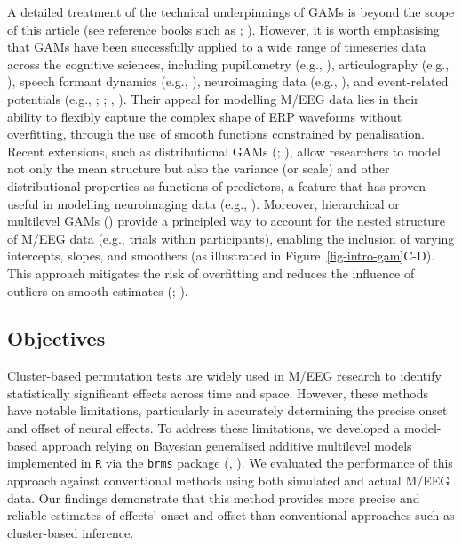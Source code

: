 \documentclass[
  doc,
  floatsintext,
  longtable,
  a4paper,
  nolmodern,
  notxfonts,
  notimes,
  colorlinks=true,linkcolor=blue,citecolor=blue,urlcolor=blue]{apa7}
\begin{document}
A detailed treatment of the technical underpinnings of GAMs is beyond
the scope of this article (see reference books such as
;
). However, it is worth emphasising
that GAMs have been successfully applied to a wide range of timeseries
data across the cognitive sciences, including pupillometry (e.g.,
), articulography (e.g.,
), speech formant dynamics
(e.g., ), neuroimaging
data (e.g., ), and
event-related potentials (e.g., ; ;
,
). Their appeal for modelling M/EEG data
lies in their ability to flexibly capture the complex shape of ERP
waveforms without overfitting, through the use of smooth functions
constrained by penalisation. Recent extensions, such as distributional
GAMs (;
), allow researchers to
model not only the mean structure but also the variance (or scale) and
other distributional properties as functions of predictors, a feature
that has proven useful in modelling neuroimaging data (e.g.,
). Moreover, hierarchical or
multilevel GAMs () provide a principled way to account for the
nested structure of M/EEG data (e.g., trials within participants),
enabling the inclusion of varying intercepts, slopes, and smoothers (as
illustrated in Figure~\ref{fig-intro-gam}\ignorespaces C-D). This
approach mitigates the risk of overfitting and reduces the influence of
outliers on smooth estimates (; ).

\subsection{Objectives}\label{objectives}

Cluster-based permutation tests are widely used in M/EEG research to
identify statistically significant effects across time and space.
However, these methods have notable limitations, particularly in
accurately determining the precise onset and offset of neural effects.
To address these limitations, we developed a model-based approach
relying on Bayesian generalised additive multilevel models implemented
in \texttt{R} via the \texttt{brms} package
(, ).
We evaluated the performance of this approach against conventional
methods using both simulated and actual M/EEG data. Our findings
demonstrate that this method provides more precise and reliable
estimates of effects' onset and offset than conventional approaches such
as cluster-based inference.
\end{document}
